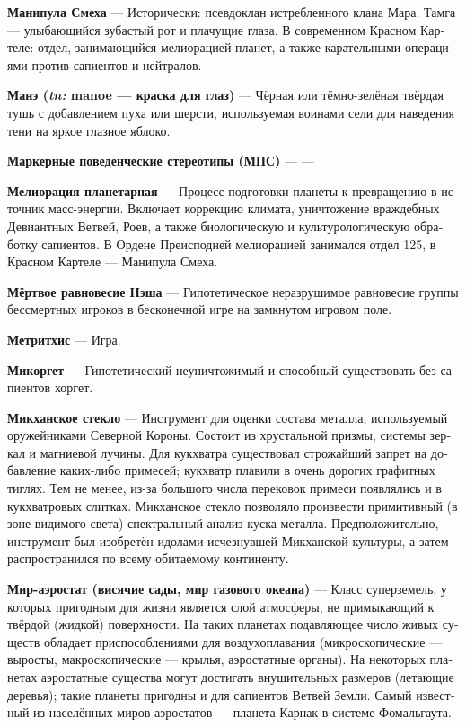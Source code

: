 \documentclass[a4paper,12pt,fleqn]{book}\usepackage{polyglossia}\setdefaultlanguage[babelshorthands=true]{russian}\setotherlanguage{english}\defaultfontfeatures{Ligatures=TeX,Mapping=tex-text}\usepackage{xcolor}\newcommand{\ml}[3]{#2}
\newcommand{\theterm}[3]{\textbf{\hypertarget{#1}{#2}} --- #3}
\newcommand{\theorigin}[3]{\textit{#1:} #2 --- #3}
\begin{document}
{\theterm{laughing-manipula}
{Манипула Смеха}
{Исторически: псевдоклан истребленного клана Мара.
Тамга --- улыбающийся зубастый рот и плачущие глаза.
В современном Красном Картеле: отдел, занимающийся мелиорацией планет, а также карательными операциями против сапиентов и нейтралов.}

\theterm{manoe}
{Манэ (\theorigin{tn}{manoe}{краска для глаз})}
{Чёрная или тёмно-зелёная твёрдая тушь с добавлением пуха или шерсти, используемая воинами сели для наведения тени на яркое глазное яблоко.}

\theterm{mbs}
{Маркерные поведенческие стереотипы (МПС)}
{---}

\theterm{melioration}
{Мелиорация планетарная}
{Процесс подготовки планеты к превращению в источник масс-энергии.
Включает коррекцию климата, уничтожение враждебных Девиантных Ветвей, Роев, а также биологическую и культурологическую обработку сапиентов.
В Ордене Преисподней мелиорацией занимался отдел 125, в Красном Картеле --- Манипула Смеха.}

\theterm{dead-nash-equilibrium}
{Мёртвое равновесие Нэша}
{Гипотетическое неразрушимое равновесие группы бессмертных игроков в бесконечной игре на замкнутом игровом поле.}

\theterm{metritchis}
{Метритхис}
{Игра.}

\theterm{micorget} %
{Микоргет}
{Гипотетический неуничтожимый и способный существовать без сапиентов хоргет.}

\theterm{mikchan-mirrors}
{Микханское стекло}
{Инструмент для оценки состава металла, используемый оружейниками Северной Короны.
Состоит из хрустальной призмы, системы зеркал и магниевой лучины.
Для кукхватра существовал строжайший запрет на добавление каких-либо примесей; кукхватр плавили в очень дорогих графитных тиглях.
Тем не менее, из-за большого числа перековок примеси появлялись и в кукхватровых слитках.
Микханское стекло позволяло произвести примитивный (в зоне видимого света) спектральный анализ куска металла.
Предположительно, инструмент был изобретён идолами исчезнувшей Микханской культуры, а затем распространился по всему обитаемому континенту.}

\theterm{aerostatic-world}
{Мир-аэростат (висячие сады, мир газового океана)}
{Класс суперземель, у которых пригодным для жизни является слой атмосферы, не примыкающий к твёрдой (жидкой) поверхности.
На таких планетах подавляющее число живых существ обладает приспособлениями для воздухоплавания (микроскопические --- выросты, макроскопические --- крылья, аэростатные органы).
На некоторых планетах аэростатные существа могут достигать внушительных размеров (летающие деревья);
такие планеты пригодны и для сапиентов Ветвей Земли.
Самый известный из населённых миров-аэростатов --- планета Карнак в системе Фомальгаута.}

}
\end{document}
